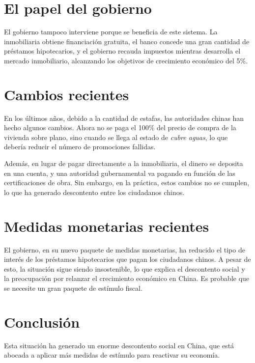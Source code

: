 \documentclass{article}
\begin{document}
\section*{El papel del gobierno}

El gobierno tampoco interviene porque se beneficia de este sistema. La inmobiliaria obtiene financiación gratuita, el banco concede una gran cantidad de préstamos hipotecarios, y el gobierno recauda impuestos mientras desarrolla el mercado inmobiliario, alcanzando los objetivos de crecimiento económico del 5\%.

\section*{Cambios recientes}

En los últimos años, debido a la cantidad de estafas, las autoridades chinas han hecho algunos cambios. Ahora no se paga el 100\% del precio de compra de la vivienda sobre plano, sino cuando se llega al estado de \textit{cubre aguas}, lo que debería reducir el número de promociones fallidas.

Además, en lugar de pagar directamente a la inmobiliaria, el dinero se deposita en una cuenta, y una autoridad gubernamental va pagando en función de las certificaciones de obra. Sin embargo, en la práctica, estos cambios no se cumplen, lo que ha generado descontento entre los ciudadanos chinos.

\section*{Medidas monetarias recientes}

El gobierno, en su nuevo paquete de medidas monetarias, ha reducido el tipo de interés de los préstamos hipotecarios que pagan los ciudadanos chinos. A pesar de esto, la situación sigue siendo insostenible, lo que explica el descontento social y la preocupación por relanzar el crecimiento económico en China. Es probable que se necesite un gran paquete de estímulo fiscal.

\section*{Conclusión}

Esta situación ha generado un enorme descontento social en China, que está abocada a aplicar más medidas de estímulo para reactivar su economía.
\end{document}
